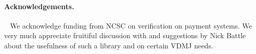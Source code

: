 \documentclass[runningheads,a4paper]{llncs}
\begin{document}
\paragraph*{Acknowledgements.}~
%
We acknowledge funding from NCSC on verification on payment systems. We very much appreciate fruitiful discussion with and suggestions by Nick Battle about the usefulness of such a library and on certain VDMJ needs. 


%


\end{document}
